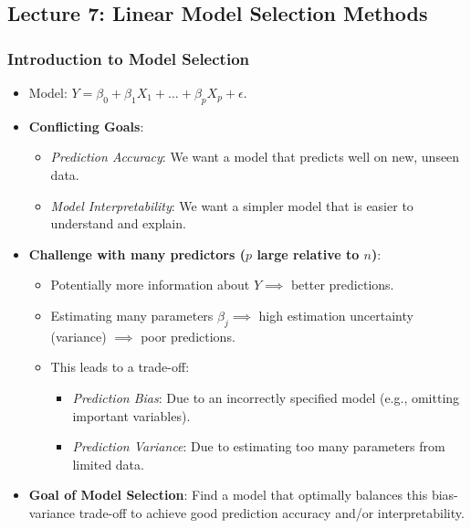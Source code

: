 \documentclass[12pt,a4paper]{article}
\begin{document}
\begin{itemize}
\begin{itemize}
\begin{itemize}
\subsection{Lecture 7: Linear Model Selection Methods }
    \subsubsection{Introduction to Model Selection}
        \begin{itemize}
            \item Model: $Y = \beta_0 + \beta_1 X_1 + \dots + \beta_p X_p + \epsilon$.
            \item \textbf{Conflicting Goals}:
                \begin{itemize}
                    \item \textit{Prediction Accuracy}: We want a model that predicts well on new, unseen data.
                    \item \textit{Model Interpretability}: We want a simpler model that is easier to understand and explain.
                \end{itemize}
            \item \textbf{Challenge with many predictors ($p$ large relative to $n$)}:
                \begin{itemize}
                    \item Potentially more information about $Y \implies$ better predictions.
                    \item Estimating many parameters $\beta_j \implies$ high estimation uncertainty (variance) $\implies$ poor predictions.
                    \item This leads to a trade-off:
                        \begin{itemize}
                            \item \textit{Prediction Bias}: Due to an incorrectly specified model (e.g., omitting important variables).
                            \item \textit{Prediction Variance}: Due to estimating too many parameters from limited data.
                        \end{itemize}
                \end{itemize}
            \item \textbf{Goal of Model Selection}: Find a model that optimally balances this bias-variance trade-off to achieve good prediction accuracy and/or interpretability.
        \end{itemize}


\end{itemize}
\end{itemize}
\end{itemize}
\end{document}
